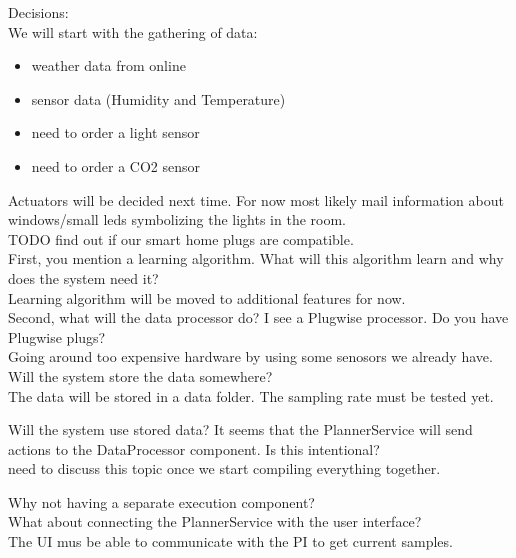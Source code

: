 \documentclass[DIN, pagenumber=false, fontsize=11pt, parskip=half]{scrartcl}
\begin{document}


Decisions:\\
We will start with the gathering of data:\\
\begin{itemize}
\item weather data from online
\item sensor data (Humidity and Temperature)
\item need to order a light sensor
\item need to order a CO2 sensor
\end{itemize}

Actuators will be decided next time. For now most likely mail information about windows/small leds symbolizing the lights in the room.\\
TODO find out if our smart home plugs are compatible.\\

%
First, you mention a learning algorithm. What will this algorithm learn and why does the system need it? \\
Learning algorithm will be moved to additional features for now.\\

Second, what will the data processor do? I see a Plugwise processor. Do you have Plugwise plugs? \\
Going around too expensive hardware by using some senosors we already have.\\

Will the system store the data somewhere? \\
The data will be stored in a data folder. The sampling rate must be tested yet. 

Will the system use stored data? It seems that the PlannerService will send actions to the DataProcessor component. Is this intentional? \\
need to discuss this topic once we start compiling everything together.

Why not having a separate execution component? \\

What about connecting the PlannerService with the user interface? \\
The UI mus be able to communicate with the PI to get current samples.
\end{document}
